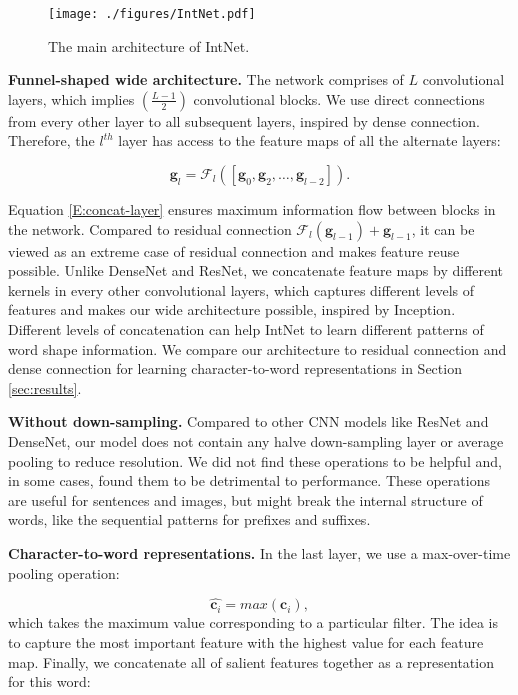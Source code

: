 \documentclass[11pt,a4paper]{article}
\begin{document}
\begin{figure}[!htb]
  \centering
  \texttt{[image: ./figures/IntNet.pdf]}
  \caption{The main architecture of IntNet.}
  \label{fig-DCC2W}
\end{figure}

\textbf{Funnel-shaped wide architecture.} The network comprises of $L$ convolutional layers, which implies $(\frac{L-1}{2})$ convolutional blocks. We use direct connections from every other layer to all subsequent layers, inspired by dense connection. Therefore, the $l^{th}$ layer has access to the feature maps of all the alternate layers:

\begin{equation}
\textbf{g}_{l} = \mathcal{F}_{l}([\textbf{g}_0, \textbf{g}_2, \dots, \textbf{g}_{l-2}]).
\label{E:concat-layer}
\end{equation}

Equation \ref{E:concat-layer} ensures maximum information flow between blocks in the network. Compared to residual connection $\mathcal{F}_{l}(\textbf{g}_{l-1})+\textbf{g}_{l-1}$, it can be viewed as an extreme case of residual connection and makes feature reuse possible. Unlike DenseNet and ResNet, we concatenate feature maps by different kernels in every other convolutional layers, which captures different levels of features and makes our wide architecture possible, inspired by Inception. Different levels of concatenation can help IntNet to learn different patterns of word shape information. We compare our architecture to residual connection and dense connection for learning character-to-word representations in Section \ref{sec:results}. 

\textbf{Without down-sampling.} Compared to other CNN models like ResNet and DenseNet, our model does not contain any halve down-sampling layer or average pooling to reduce resolution. We did not find these operations to be helpful and, in some cases, found them to be detrimental to performance. These operations are useful for sentences and images, but might break the internal structure of words, like the sequential patterns for prefixes and suffixes. 

\textbf{Character-to-word representations.} In the last layer, we use a max-over-time pooling operation:

\begin{equation}
\hat{\textbf{c}_i} = max(\textbf{c}_i),
\label{E:maxpooling}
\end{equation}
which takes the maximum value corresponding to a particular filter. The idea is to capture the most important feature with the highest value for each feature map. Finally, we concatenate all of salient features together as a representation for this word: 
\end{document}
